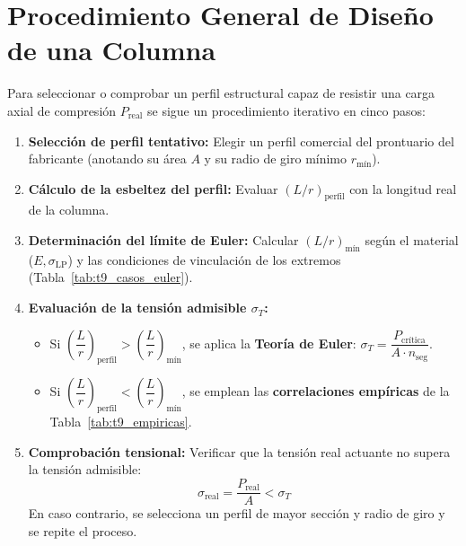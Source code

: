 
\section{Procedimiento General de Diseño de una Columna}

Para seleccionar o comprobar un perfil estructural capaz de resistir una carga axial de compresión $P_{\text{real}}$ se sigue un procedimiento iterativo en cinco pasos:
\begin{enumerate}
    \item \textbf{Selección de perfil tentativo:} Elegir un perfil comercial del prontuario del fabricante (anotando su área $A$ y su radio de giro mínimo $r_{\text{mín}}$).
    \item \textbf{Cálculo de la esbeltez del perfil:} Evaluar $(L/r)_{\text{perfil}}$ con la longitud real de la columna.
    \item \textbf{Determinación del límite de Euler:} Calcular $(L/r)_{\text{mín}}$ según el material ($E, \sigma_{\text{LP}}$) y las condiciones de vinculación de los extremos (Tabla~\ref{tab:t9_casos_euler}).
    \item \textbf{Evaluación de la tensión admisible $\sigma_T$:}
          \begin{itemize}
              \item Si $\left(\dfrac{L}{r}\right)_{\text{perfil}} > \left(\dfrac{L}{r}\right)_{\text{mín}}$, se aplica la \textbf{Teoría de Euler}: $\sigma_T = \dfrac{P_{\text{crítica}}}{A \cdot n_{\text{seg}}}$.
              \item Si $\left(\dfrac{L}{r}\right)_{\text{perfil}} < \left(\dfrac{L}{r}\right)_{\text{mín}}$, se emplean las \textbf{correlaciones empíricas} de la Tabla~\ref{tab:t9_empiricas}.
          \end{itemize}
    \item \textbf{Comprobación tensional:} Verificar que la tensión real actuante no supera la tensión admisible:
          \begin{equation}
              \sigma_{\text{real}} = \frac{P_{\text{real}}}{A} < \sigma_T
              \label{eq:t9_comprobacion_columna}
          \end{equation}
          En caso contrario, se selecciona un perfil de mayor sección y radio de giro y se repite el proceso.
\end{enumerate}

